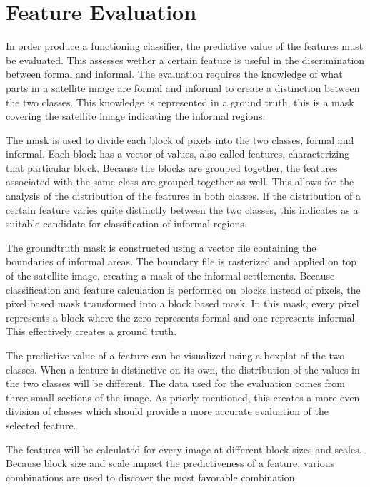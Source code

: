 
\section{Feature Evaluation}

In order produce a functioning classifier, the predictive value of the features
must be evaluated. This assesses wether a certain feature is useful in the
discrimination between formal and informal. The evaluation requires the
knowledge of what parts in a satellite image are formal and informal to create
a distinction between the two classes. This knowledge is represented in
a ground truth, this is a mask covering the satellite image indicating the
informal regions.

The mask is used to divide each block of pixels into the two classes, formal
and informal. Each block has a vector of values, also called features,
characterizing that particular block. Because the blocks are grouped together,
the features associated with the same class are grouped together as well. This
allows for the analysis of the distribution of the features in both classes. If
the distribution of a certain feature varies quite distinctly between the two
classes, this indicates as a suitable candidate for classification of informal
regions.

The groundtruth mask is constructed using a vector file containing the
boundaries of informal areas. The boundary file is rasterized and applied on
top of the satellite image, creating a mask of the informal settlements.
Because classification and feature calculation is performed on blocks instead
of pixels, the pixel based mask transformed into a block based mask. In this
mask, every pixel represents a block where the zero represents formal and one
represents informal. This effectively creates a ground truth.  

The predictive value of a feature can be visualized using a boxplot of the two
classes. When a feature is distinctive on its own, the distribution of the
values in the two classes will be different. The data used for the evaluation
comes from three small sections of the image. As priorly mentioned, this
creates a more even division of classes which should provide a more accurate
evaluation of the selected feature.

The features will be calculated for every image at different block sizes and
scales. Because block size and scale impact the predictiveness of a feature,
various combinations are used to discover the most favorable combination.

